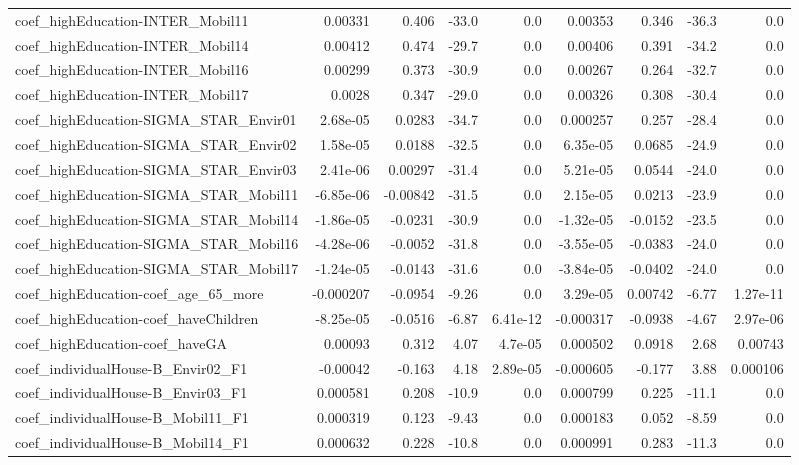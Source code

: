 \begin{tabular}{lrrrrrrrr}
coef_highEducation-INTER_Mobil11 & 0.00331 & 0.406 & -33.0 & 0.0 & 0.00353 & 0.346 & -36.3 & 0.0 \\
coef_highEducation-INTER_Mobil14 & 0.00412 & 0.474 & -29.7 & 0.0 & 0.00406 & 0.391 & -34.2 & 0.0 \\
coef_highEducation-INTER_Mobil16 & 0.00299 & 0.373 & -30.9 & 0.0 & 0.00267 & 0.264 & -32.7 & 0.0 \\
coef_highEducation-INTER_Mobil17 & 0.0028 & 0.347 & -29.0 & 0.0 & 0.00326 & 0.308 & -30.4 & 0.0 \\
coef_highEducation-SIGMA_STAR_Envir01 & 2.68e-05 & 0.0283 & -34.7 & 0.0 & 0.000257 & 0.257 & -28.4 & 0.0 \\
coef_highEducation-SIGMA_STAR_Envir02 & 1.58e-05 & 0.0188 & -32.5 & 0.0 & 6.35e-05 & 0.0685 & -24.9 & 0.0 \\
coef_highEducation-SIGMA_STAR_Envir03 & 2.41e-06 & 0.00297 & -31.4 & 0.0 & 5.21e-05 & 0.0544 & -24.0 & 0.0 \\
coef_highEducation-SIGMA_STAR_Mobil11 & -6.85e-06 & -0.00842 & -31.5 & 0.0 & 2.15e-05 & 0.0213 & -23.9 & 0.0 \\
coef_highEducation-SIGMA_STAR_Mobil14 & -1.86e-05 & -0.0231 & -30.9 & 0.0 & -1.32e-05 & -0.0152 & -23.5 & 0.0 \\
coef_highEducation-SIGMA_STAR_Mobil16 & -4.28e-06 & -0.0052 & -31.8 & 0.0 & -3.55e-05 & -0.0383 & -24.0 & 0.0 \\
coef_highEducation-SIGMA_STAR_Mobil17 & -1.24e-05 & -0.0143 & -31.6 & 0.0 & -3.84e-05 & -0.0402 & -24.0 & 0.0 \\
coef_highEducation-coef_age_65_more & -0.000207 & -0.0954 & -9.26 & 0.0 & 3.29e-05 & 0.00742 & -6.77 & 1.27e-11 \\
coef_highEducation-coef_haveChildren & -8.25e-05 & -0.0516 & -6.87 & 6.41e-12 & -0.000317 & -0.0938 & -4.67 & 2.97e-06 \\
coef_highEducation-coef_haveGA & 0.00093 & 0.312 & 4.07 & 4.7e-05 & 0.000502 & 0.0918 & 2.68 & 0.00743 \\
coef_individualHouse-B_Envir02_F1 & -0.00042 & -0.163 & 4.18 & 2.89e-05 & -0.000605 & -0.177 & 3.88 & 0.000106 \\
coef_individualHouse-B_Envir03_F1 & 0.000581 & 0.208 & -10.9 & 0.0 & 0.000799 & 0.225 & -11.1 & 0.0 \\
coef_individualHouse-B_Mobil11_F1 & 0.000319 & 0.123 & -9.43 & 0.0 & 0.000183 & 0.052 & -8.59 & 0.0 \\
coef_individualHouse-B_Mobil14_F1 & 0.000632 & 0.228 & -10.8 & 0.0 & 0.000991 & 0.283 & -11.3 & 0.0 \\

\end{tabular}
